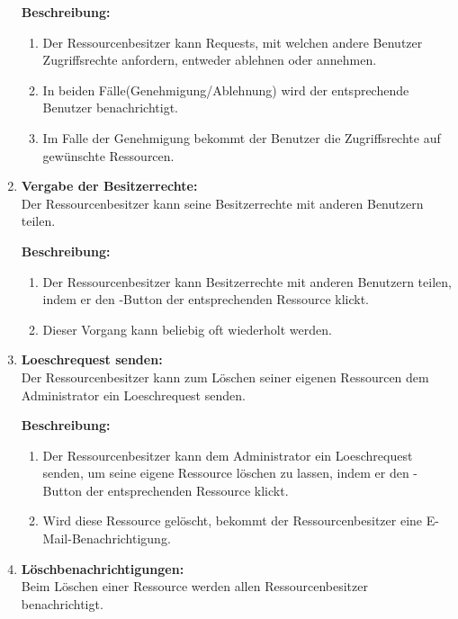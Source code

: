 \documentclass[parskip=full,11pt]{scrartcl}
\def\threedigits#1{%
  \ifnum#1<10 0\fi
  \ifnum#1<1 0\fi
  \number#1}
\begin{document}
\begin{enumerate}[label={\textbf{/F\protect\threedigits{\theenumi}0/}}, leftmargin=*, resume]
\textbf{Beschreibung:}\\
\begin{enumerate}[label=(\arabic*), leftmargin=*]

\item Der Ressourcenbesitzer kann Requests, mit welchen andere Benutzer Zugriffsrechte anfordern, entweder ablehnen oder annehmen.
\item In beiden Fälle(Genehmigung/Ablehnung) wird der entsprechende Benutzer benachrichtigt.
\item Im Falle der Genehmigung bekommt der Benutzer die Zugriffsrechte auf  gewünschte Ressourcen.
\end{enumerate}

\item \label{FARB5} \textbf{Vergabe der Besitzerrechte:}\\
Der Ressourcenbesitzer kann seine Besitzerrechte mit anderen Benutzern teilen.

\textbf{Beschreibung:}\\
\begin{enumerate}[label=(\arabic*), leftmargin=*]

\item Der Ressourcenbesitzer kann Besitzerrechte mit anderen Benutzern teilen, indem er den \grqq -Button der entsprechenden Ressource klickt.
\item Dieser Vorgang kann beliebig oft wiederholt werden.
\end{enumerate}
\item \label{FARB6} \textbf{Loeschrequest senden:}\\
Der Ressourcenbesitzer kann zum Löschen seiner eigenen Ressourcen dem Administrator ein Loeschrequest senden.

\textbf{Beschreibung:}\\
\begin{enumerate}[label=(\arabic*), leftmargin=*]
\item Der Ressourcenbesitzer kann dem Administrator ein Loeschrequest senden, um seine eigene Ressource löschen zu lassen, indem er den \grqq -Button der entsprechenden Ressource klickt.
\item Wird diese Ressource gelöscht, bekommt der Ressourcenbesitzer eine E-Mail-Benachrichtigung.
\end{enumerate}
\item \label{FARB7} \colorbox{shadecolor} {\textbf{Löschbenachrichtigungen:}}\\
Beim Löschen einer Ressource werden allen Ressourcenbesitzer benachrichtigt.\\\


\end{enumerate}
\end{document}

